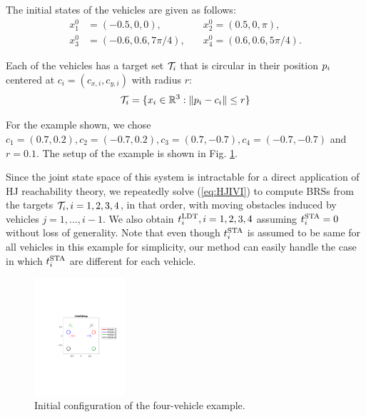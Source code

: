 The initial states of the vehicles are given as follows:
\begin{equation}
\begin{aligned}
x_1^0 &= (-0.5, 0, 0), \quad &x_2^0 = (0.5, 0, \pi), \\
x_3^0 &= \left(-0.6, 0.6, 7\pi/4\right), \quad &x_4^0 = \left(0.6, 0.6, 5\pi/4\right).
\end{aligned}
\end{equation}

\noindent Each of the vehicles has a target set $\mathcal{T}_i$ that is circular in their position $p_i$ centered at $c_i = (c_{x,i}, c_{y,i})$ with radius $r$:
\vspace{-0.2em}
\begin{equation}
\mathcal{T}_i = \{x_i \in \mathbb{R}^3: \|p_i - c_i\| \le r\}
\end{equation}

\noindent For the example shown, we chose $c_1 = (0.7, 0.2), c_2 = (-0.7, 0.2), c_3 = (0.7, -0.7), c_4 = (-0.7, -0.7)$ and $r = 0.1$. The setup of the example is shown in Fig. \ref{fig:init_setup}.

Since the joint state space of this system is intractable for a direct application of HJ reachability theory, we repeatedly solve (\ref{eq:HJIVI}) to compute BRSs from the targets $\mathcal{T}_i, i =1,2,3,4$, in that order, with moving obstacles induced by vehicles $j=1,\ldots,i-1$. We also obtain $t^\text{LDT}_i, i=1,2,3,4$ assuming $t^\text{STA}_i=0$ without loss of generality. Note that even though $t^\text{STA}_i$ is assumed to be same for all vehicles in this example for simplicity, our method can easily handle the case in which $t^\text{STA}_i$ are different for each vehicle.

\begin{figure}
  \centering
  \includegraphics[width=0.30\textwidth]{"fig/init_setup"}
  \caption{Initial configuration of the four-vehicle example.}
  \label{fig:init_setup}
  \vspace{-1.5em}
\end{figure}

